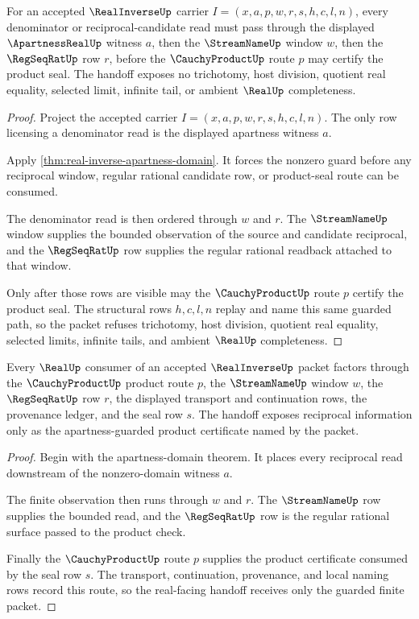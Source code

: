 \begin{theorem}
\label{thm:real-inverse-apartness-denominator-handoff}
For an accepted $\RealInverseUp$ carrier $I=(x,a,p,w,r,s,h,c,l,n)$, every denominator or reciprocal-candidate read must pass through the displayed $\ApartnessRealUp$ witness $a$, then the $\StreamNameUp$ window $w$, then the $\RegSeqRatUp$ row $r$, before the $\CauchyProductUp$ route $p$ may certify the product seal. The handoff exposes no trichotomy, host division, quotient real equality, selected limit, infinite tail, or ambient $\RealUp$ completeness.
\end{theorem}
\begin{proof}
Project the accepted carrier $I=(x,a,p,w,r,s,h,c,l,n)$. The only row licensing a denominator read is the displayed apartness witness $a$.

Apply \autoref{thm:real-inverse-apartness-domain}. It forces the nonzero guard before any reciprocal window, regular rational candidate row, or product-seal route can be consumed.

The denominator read is then ordered through $w$ and $r$. The $\StreamNameUp$ window supplies the bounded observation of the source and candidate reciprocal, and the $\RegSeqRatUp$ row supplies the regular rational readback attached to that window.

Only after those rows are visible may the $\CauchyProductUp$ route $p$ certify the product seal. The structural rows $h,c,l,n$ replay and name this same guarded path, so the packet refuses trichotomy, host division, quotient real equality, selected limits, infinite tails, and ambient $\RealUp$ completeness.
\end{proof}

\begin{theorem}
\label{thm:real-inverse-product-seal-handoff}
Every $\RealUp$ consumer of an accepted $\RealInverseUp$ packet factors through the $\CauchyProductUp$ product route $p$, the $\StreamNameUp$ window $w$, the $\RegSeqRatUp$ row $r$, the displayed transport and continuation rows, the provenance ledger, and the seal row $s$. The handoff exposes reciprocal information only as the apartness-guarded product certificate named by the packet.
\end{theorem}
\begin{proof}
Begin with the apartness-domain theorem. It places every reciprocal read downstream of the nonzero-domain witness $a$.

The finite observation then runs through $w$ and $r$. The $\StreamNameUp$ row supplies the bounded read, and the $\RegSeqRatUp$ row is the regular rational surface passed to the product check.

Finally the $\CauchyProductUp$ route $p$ supplies the product certificate consumed by the seal row $s$. The transport, continuation, provenance, and local naming rows record this route, so the real-facing handoff receives only the guarded finite packet.
\end{proof}

